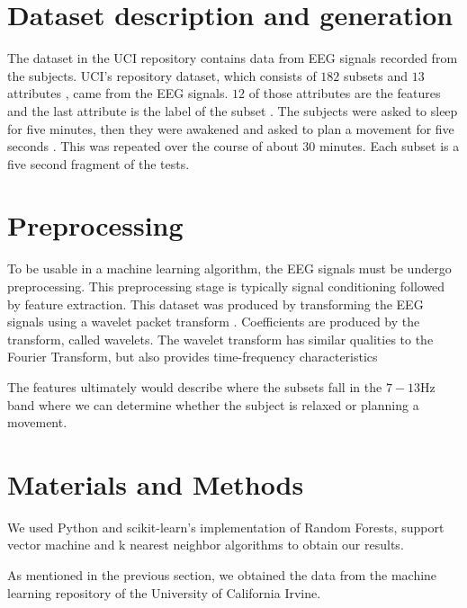 \documentclass[conference,compsoc]{IEEEtran}
\begin{document}
\section{Dataset description and generation}
The dataset in the UCI repository contains data from EEG signals recorded from the  subjects.  UCI's repository dataset, which consists of $182$ subsets and $13$ attributes \cite{classsvm}, came from the EEG signals. $12$ of those attributes are the features and the last attribute is the label of the subset \cite{online}. 
The subjects were asked to sleep for five minutes, then they were awakened and asked to plan a movement for five seconds \cite{classsvm}. This was repeated over the course of about 30 minutes.  Each subset is a five second fragment of the tests.

\section{Preprocessing}
To be usable in a machine learning algorithm, the EEG signals must be undergo preprocessing.  This preprocessing stage is typically signal conditioning followed by feature extraction.  This dataset was produced by transforming the EEG signals using a wavelet packet transform \cite{wavelet} . Coefficients are produced by the transform, called wavelets. The wavelet transform has similar qualities to the Fourier Transform, but also provides time-frequency characteristics%

The features ultimately would describe where the subsets fall in the $7-13\si{\hertz}$ band where we can determine whether the subject is relaxed or planning a movement.

\section{Materials and Methods}
We used Python and scikit-learn's implementation of Random Forests, support vector machine and k nearest neighbor algorithms to obtain our results.  


As mentioned in the previous section, we obtained the data from the machine learning repository of the University of California Irvine.%
\end{document}
